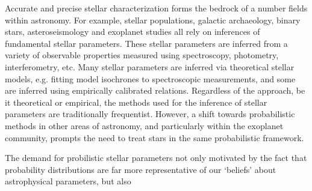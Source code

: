 


Accurate and precise stellar characterization forms the bedrock of a number
fields within astronomy.
For example, stellar populations, galactic archaeology, binary stars,
asteroseismology and exoplanet studies all rely on inferences of fundamental
stellar parameters.
These stellar parameters are inferred from a variety of observable properties
measured using spectroscopy, photometry, interferometry, etc.
Many stellar parameters are inferred via theoretical stellar models, e.g.
fitting model isochrones to spectroscopic measurements, and
some are inferred using empirically calibrated relations.
Regardless of the approach, be it theoretical or empirical, the methods used
for the inference of stellar parameters are traditionally frequentist.
However, a shift towards probabilistic methods in other areas of astronomy,
and particularly within the exoplanet community, prompts the need to treat
stars in the same probabilistic framework.

The demand for probilistic stellar parameters not only motivated by the fact
that probability distributions are far more representative of our `beliefs'
about astrophysical parameters, but also





